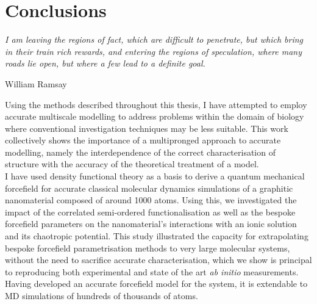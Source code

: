 \chapter{Conclusions}

\epigraph{\textit{I am leaving the regions of fact, which are difficult to penetrate, but which bring in their train rich rewards, and entering the regions of speculation, where many roads lie open, but where a few lead to a definite goal.}}{William Ramsay}

Using the methods described throughout this thesis, I have attempted to employ accurate multiscale modelling to address problems within the domain of biology where conventional investigation techniques may be less suitable. This work collectively shows the importance of a multipronged approach to accurate modelling, namely the interdependence of the correct characterisation of structure with the accuracy of the theoretical treatment of a model. \\

I have used density functional theory as a basis to derive a quantum mechanical forcefield for accurate classical molecular dynamics simulations of a graphitic nanomaterial composed of around 1000 atoms. Using this, we investigated the impact of the correlated semi-ordered functionalisation as well as the bespoke forcefield parameters on the nanomaterial's interactions with an ionic solution and its chaotropic potential. This study illustrated the capacity for extrapolating bespoke forcefield parametrisation methods to very large molecular systems, without the need to sacrifice accurate characterisation, which we show is principal to reproducing both experimental and state of the art \textit{ab initio} measurements. Having developed an accurate forcefield model for the system, it is extendable to MD simulations of hundreds of thousands of atoms. \\


